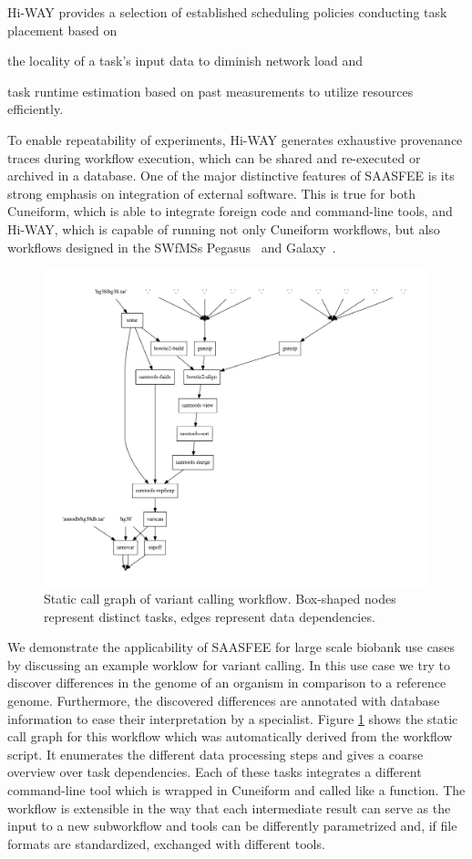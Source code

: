 Hi-WAY provides a selection of established scheduling policies conducting task placement based on
\begin{inparaenum}[(a)]
  \item the locality of a task's input data to diminish network load and
  \item task runtime estimation based on past measurements to utilize resources efficiently.
\end{inparaenum}
To enable repeatability of experiments, Hi-WAY generates exhaustive provenance traces during workflow execution, which can be shared and re-executed or archived in a database. One of the major distinctive features of SAASFEE is its strong emphasis on integration of external software. This is true for both Cuneiform, which is able to integrate foreign code and command-line tools, and Hi-WAY, which is capable of running not only Cuneiform workflows, but also workflows designed in the SWfMSs Pegasus~\cite{pegasus_fgcs} and Galaxy~\cite{Goecks10}.



\begin{figure}
  \centering
  \includegraphics[width=.8\textwidth]{imgs/variant_call11b.pdf}
  \caption{Static call graph of variant calling workflow. Box-shaped nodes represent distinct tasks, edges represent data dependencies.}
  \label{fig:variant_call}
\end{figure}

We demonstrate the applicability of SAASFEE for large scale biobank use cases by discussing an example worklow for variant calling. In this use case we try to discover differences in the genome of an organism in comparison to a reference genome. Furthermore, the discovered differences are annotated with database information to ease their interpretation by a specialist. Figure \ref{fig:variant_call} shows the static call graph for this workflow which was automatically derived from the workflow script. It enumerates the different data processing steps and gives a coarse overview over task dependencies. Each of these tasks integrates a different command-line tool which is wrapped in Cuneiform and called like a function. The workflow is extensible in the way that each intermediate result can serve as the input to a new subworkflow and tools can be differently parametrized and, if file formats are standardized, exchanged with different tools.




